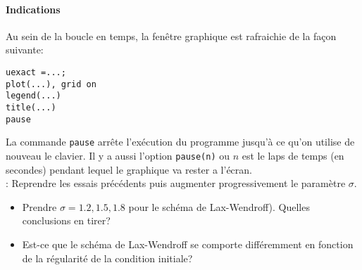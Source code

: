 \documentclass[12pt,a4paper]{article}
\begin{document}
\paragraph{Indications}

Au sein de la boucle en temps, la fen\^etre graphique est
rafraichie de la fa\c{c}on suivante: 
\begin{verbatim}
uexact =...;
plot(...), grid on
legend(...)
title(...) 
pause
\end{verbatim}
La commande \texttt{pause} arr\^ete l'ex\'ecution du
programme jusqu'\`a ce qu'on utilise de nouveau le clavier. Il y a aussi l'option \texttt{pause(n)} ou $n$ est le laps de temps (en secondes) pendant lequel le graphique va rester a l'écran. \\


: Reprendre les essais pr\'ec\'edents puis augmenter
progressivement le param\`etre $\sigma$.
\begin{itemize}
\item Prendre $\sigma=1.2,1.5,1.8$ pour le sch\'ema de Lax-Wendroff). Quelles
conclusions en tirer?
\item Est-ce que le schéma de Lax-Wendroff se comporte différemment en fonction de la régularité de la condition initiale?
\end{itemize}
\end{document}
